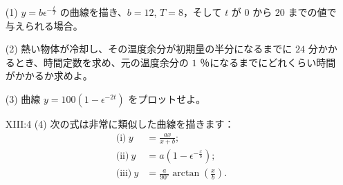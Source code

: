 \documentclass[a4paper,11pt,openany]{ltjsbook}
\newcommand{\Pageref}[2][p.]{#1~\ref{#2}}
\begin{document}
\begin{enumerate}
強度を半分に減らすために必要な厚さ \( l \) を求めるには、等式 \( 50 = 100 \times  \epsilon^{-0.02l} \) や \( 0.5 = \epsilon^{-0.02l} \) を解く必要があります。これは対数形式に書き換えることで
\[
 \log 0.5 = -0.02 \times  l \times  \log \epsilon, 
\]
となり、これから
\[
 l = \frac{-0.3010}{-0.02 \times  0.4343} = 34.7 \text{ cm} \approx 34.5 \text{ cm}. 
\]

(3) 放射性物質の未変化量 \( Q \) は、その初期量 \( Q_0 \) と関係し、その関係は \( Q = Q_0 \epsilon^{-\lambda t} \) で与えられることが知られています。ここで、\(\lambda\) は定数であり、\( t \) は変化が始まってから経過した秒数です。

「ラジウム A」の場合、時間が秒単位で表されるとき、実験により \(\lambda = 3.85 \times  10^{-3}\) と示されています。半分の物質が変化するのに必要な時間を求めましょう。（この時間は「平均寿命」と呼ばれます）

\[
0.5 = \epsilon^{-0.00385t}
\]

\begin{align*}
\log 0.5 &= -0.00385t \times \log \epsilon; \\
\therefore t &= 3\text{ 分鐘 非常に近似}。
\end{align*}

\par\textbf{【演習 XIII】}\par (答えは \Pageref[page]{AnsEx:XIII} を参照してください。)

\item[(1)] \( y = b \epsilon^{-\frac{t}{T}} \) の曲線を描き、\( b = 12 \), \( T = 8 \)，そして \( t \) が \( 0 \) から \( 20 \) までの値で与えられる場合。

\item[(2)] 熱い物体が冷却し、その温度余分が初期量の半分になるまでに \( 24 \) 分かかるとき、時間定数を求め、元の温度余分の \( 1 \) ％になるまでにどれくらい時間がかかるか求めよ。

\item[(3)] 曲線 \( y = 100(1-\epsilon^{-2t}) \) をプロットせよ。

\item[XIII:4]{(4)} 次の式は非常に類似した曲線を描きます：
\begin{align*}
\text{(i)}\   y &= \frac{ax}{x + b}; \\
\text{(ii)}\  y &= a(1 - \epsilon^{-\frac{x}{b}}); \\
\text{(iii)}\ y &= \frac{a}{90^\circ} \arctan \left(\frac{x}{b}\right).
\end{align*}


\end{enumerate}
\end{document}
